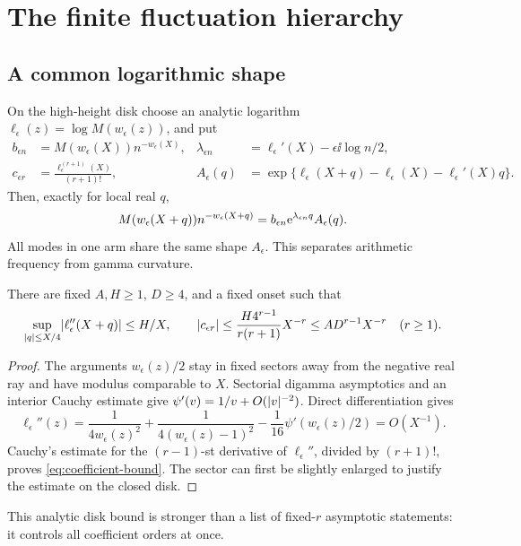 \section{The finite fluctuation hierarchy}
\label{sec:hierarchy}
\subsection{A common logarithmic shape}
On the high-height disk choose an analytic logarithm
\(\ell_\epsilon(z)=\log M(w_\epsilon(z))\), and put
\begin{subequations}\label{eq:frozen-data}
\begin{align}
 b_{\epsilon n}&=M(w_\epsilon(X))n^{-w_\epsilon(X)},&
 \lambda_{\epsilon n}&=\ell_\epsilon'(X)-\epsilon\ii\log n/2,\\
 c_{\epsilon r}&=\frac{\ell_\epsilon^{(r+1)}(X)}{(r+1)!},&
 A_\epsilon(q)&=\exp\{\ell_\epsilon(X+q)-\ell_\epsilon(X)
                                      -\ell_\epsilon'(X)q\}.
\end{align}
\end{subequations}
Then, exactly for local real \(q\),
\[
 M(w_\epsilon(X+q))n^{-w_\epsilon(X+q)}
       =b_{\epsilon n}\mathrm e^{\lambda_{\epsilon n}q}A_\epsilon(q).
\]
All modes in one arm share the same shape \(A_\epsilon\).
This separates arithmetic frequency from gamma curvature.

\begin{lemma}\label{lem:coeff}
There are fixed \(A,H\ge1\), \(D\ge4\), and a fixed onset such that
\begin{equation}
 \sup_{\lvert q\rvert\le X/4}\lvert \ell_\epsilon''(X+q)\rvert\le H/X,
 \qquad
 \lvert c_{\epsilon r}\rvert\le
 \frac{H4^{r-1}}{r(r+1)}X^{-r}\le AD^{r-1}X^{-r}
 \quad(r\ge1).
 \label{eq:coefficient-bound}
\end{equation}
\end{lemma}
\begin{proof}
The arguments \(w_\epsilon(z)/2\) stay in fixed sectors away from
the negative real ray and have modulus comparable to \(X\).
Sectorial digamma asymptotics and an interior Cauchy estimate give
\(\psi'(v)=1/v+O(\lvert v\rvert^{-2})\). Direct differentiation gives
\[
 \ell_\epsilon''(z)=\frac1{4w_\epsilon(z)^2}
 +\frac1{4(w_\epsilon(z)-1)^2}
 -\frac1{16}\psi'(w_\epsilon(z)/2)=O(X^{-1}).
\]
Cauchy's estimate for the \((r-1)\)-st derivative of
\(\ell_\epsilon''\), divided by \((r+1)!\), proves
\eqref{eq:coefficient-bound}. The sector can first be slightly
enlarged to justify the estimate on the closed disk.
\end{proof}
This analytic disk bound is stronger than a list of fixed-\(r\)
asymptotic statements: it controls all coefficient orders at once.

